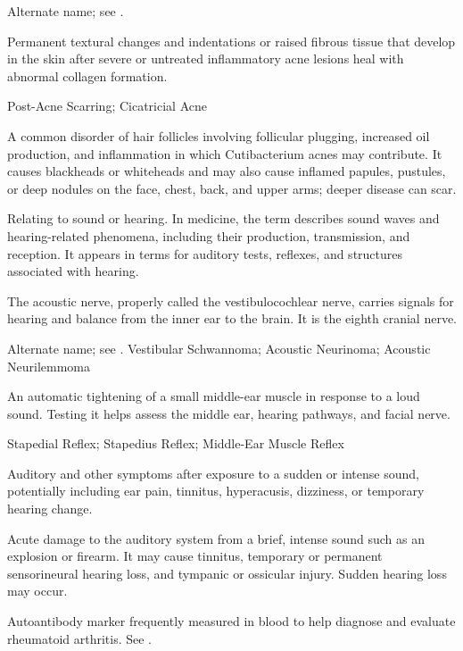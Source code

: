  Alternate name; see .

 Permanent textural changes and indentations or raised fibrous tissue that develop in the skin after severe or untreated inflammatory acne lesions heal with abnormal collagen formation.

\synonyms
Post-Acne Scarring; Cicatricial Acne

 A common disorder of hair follicles involving follicular plugging, increased oil production, and inflammation in which Cutibacterium acnes may contribute. It causes blackheads or whiteheads and may also cause inflamed papules, pustules, or deep nodules on the face, chest, back, and upper arms; deeper disease can scar.

 Relating to sound or hearing. In medicine, the term describes sound waves and hearing-related
phenomena, including their production, transmission, and reception. It appears in terms for auditory tests,
reflexes, and structures associated with hearing.

 The acoustic nerve, properly called the vestibulocochlear nerve, carries signals for hearing and balance from the inner ear to the brain. It is the eighth cranial nerve.

 Alternate name; see .
\synonyms
Vestibular Schwannoma; Acoustic Neurinoma; Acoustic Neurilemmoma

 An automatic tightening of a small middle-ear muscle in response to a loud sound. Testing it helps assess the middle ear, hearing pathways, and facial nerve.

\synonyms
Stapedial Reflex; Stapedius Reflex; Middle-Ear Muscle Reflex

 Auditory and other symptoms after exposure to a sudden or intense sound, potentially including ear pain, tinnitus, hyperacusis, dizziness, or temporary hearing change.

 Acute damage to the auditory system from a brief, intense sound such as an explosion or
firearm. It may cause tinnitus, temporary or permanent sensorineural hearing loss, and
tympanic or ossicular injury. Sudden hearing loss may occur.

 Autoantibody marker frequently measured in blood to help diagnose and evaluate rheumatoid arthritis. See .

